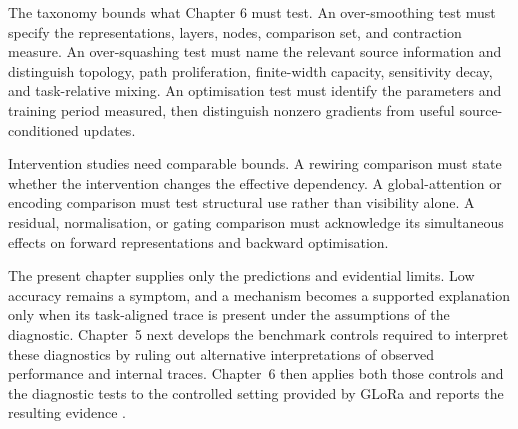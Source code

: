 The taxonomy bounds what Chapter 6 must test.
An over-smoothing test must specify the representations, layers, nodes, comparison set, and contraction measure.
An over-squashing test must name the relevant source information and distinguish topology, path proliferation, finite-width capacity, sensitivity decay, and task-relative mixing.
An optimisation test must identify the parameters and training period measured, then distinguish nonzero gradients from useful source-conditioned updates.

Intervention studies need comparable bounds.
A rewiring comparison must state whether the intervention changes the effective dependency.
A global-attention or encoding comparison must test structural use rather than visibility alone.
A residual, normalisation, or gating comparison must acknowledge its simultaneous effects on forward representations and backward optimisation.

The present chapter supplies only the predictions and evidential limits.
Low accuracy remains a symptom, and a mechanism becomes a supported explanation only when its task-aligned trace is present under the assumptions of the diagnostic.
Chapter~5 next develops the benchmark controls required to interpret these diagnostics by ruling out alternative interpretations of observed performance and internal traces.
Chapter~6 then applies both those controls and the diagnostic tests to the controlled setting provided by GLoRa and reports the resulting evidence \cite{zhou2025glora}.
